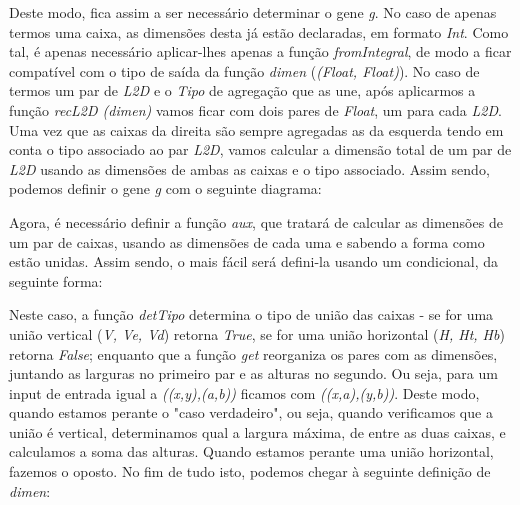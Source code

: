 \documentclass[a4paper]{article}
\newcommand{\Varid}[1]{\mathit{#1}}
\begin{document}
\vspace{0.5cm}

Deste modo, fica assim a ser necessário determinar o gene \textit{g}. No caso de apenas termos uma caixa, as dimensões desta já estão declaradas, em formato \textit{Int}. Como tal, é apenas necessário aplicar-lhes apenas a função \textit{fromIntegral}, de modo a ficar compatível com o tipo de saída da função \textit{dimen} (\textit{(Float, Float)}). No caso de termos um par de \textit{L2D} e o \textit{Tipo} de agregação que as une, após aplicarmos a função \textit{recL2D (dimen)} vamos ficar com dois pares de \textit{Float}, um para cada \textit{L2D}. Uma vez que as caixas da direita são sempre agregadas as da esquerda tendo em conta o tipo associado ao par \textit{L2D}, vamos calcular a dimensão total de um par de \textit{L2D} usando as dimensões de ambas as caixas e o tipo associado.  Assim sendo, podemos definir o gene \textit{g} com o seguinte diagrama:

\vspace{0.5cm}

\xymatrixcolsep{2pc}\xymatrixrowsep{2pc}
\centerline{}

\vspace{0.5cm}

Agora, é necessário definir a função \textit{aux}, que tratará de calcular as dimensões de um par de caixas, usando as dimensões de cada uma e sabendo a forma como estão unidas. Assim sendo, o mais fácil será defini-la usando um condicional, da seguinte forma:

\vspace{0.5cm}

\begin{center}
\fbox{\begin{minipage}{32em}
    \center $ \ensuremath{\Varid{aux}\mathrel{=}(\Varid{cond}\;(\Varid{detTipo}\comp \p1)\;((\uncurry{\Varid{max}}\times\uncurry{(\mathbin{+})})\comp \p2)\;((\uncurry{(\mathbin{+})}\times\uncurry{\Varid{max}})\comp \p2))\comp \Varid{get}} $
\end{minipage}}
\end{center}

\vspace{0.5cm}

Neste caso, a função \textit{detTipo} determina o tipo de união das caixas - se for uma união vertical (\textit{V, Ve, Vd}) retorna \textit{True}, se for uma união horizontal (\textit{H, Ht, Hb}) retorna \textit{False}; enquanto que a função \textit{get} reorganiza os pares com as dimensões, juntando as larguras no primeiro par e as alturas no segundo. Ou seja, para um input de entrada igual a \textit{((x,y),(a,b))} ficamos com \textit{((x,a),(y,b))}. Deste modo, quando estamos perante o "caso verdadeiro", ou seja, quando verificamos que a união é vertical, determinamos qual a largura máxima, de entre as duas caixas, e calculamos a soma das alturas. Quando estamos perante uma união horizontal, fazemos o oposto. No fim de tudo isto, podemos chegar à seguinte definição de \textit{dimen}:
\end{document}
